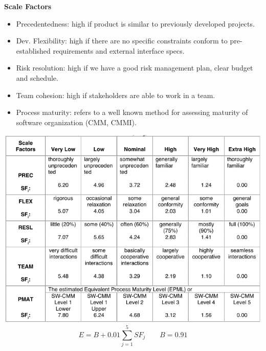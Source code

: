 \textbf{Scale Factors}\\
\begin{itemize}
    \item Precedentedness: high if product is similar to previously developed projects.
    \item Dev. Flexibility: high if there are no specific constraints conform to pre-established requirements and external interface specs.
    \item Risk resolution: high if we have a good risk management plan, clear budget and schedule.
    \item Team cohesion: high if stakeholders are able to work in a team.
    \item Process maturity: refers to a well known method for assessing maturity of software organization (CMM, CMMI).
\end{itemize}
\includegraphics[width=\linewidth]{8-project-management/scale-factors.png}
\[ E = B + 0.01 \sum_{j=1}^{5} SF_j \qquad B = 0.91 \]


